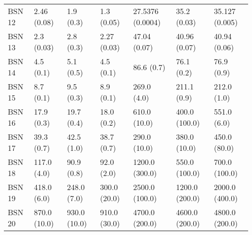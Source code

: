 \begin{tabular}{lllllll}
BSN 12 &       2.46 (0.08) &             1.9 (0.3) &         1.3 (0.05) &        27.5376 (0.0004) &                 35.2 (0.03) &           35.127 (0.005) \\
BSN 13 &        2.3 (0.03) &             2.8 (0.3) &        2.27 (0.03) &            47.04 (0.07) &                40.96 (0.07) &             40.94 (0.06) \\
BSN 14 &         4.5 (0.1) &             5.1 (0.5) &          4.5 (0.1) &              86.6 (0.7) &                  76.1 (0.2) &               76.9 (0.9) \\
BSN 15 &         8.7 (0.1) &             9.5 (0.3) &          8.9 (0.1) &             269.0 (4.0) &                 211.1 (0.9) &              212.0 (1.0) \\
BSN 16 &        17.9 (0.3) &            19.7 (0.4) &         18.0 (0.2) &            610.0 (10.0) &               400.0 (100.0) &              551.0 (6.0) \\
BSN 17 &        39.3 (0.7) &            42.5 (1.0) &         38.7 (0.7) &            290.0 (10.0) &                380.0 (10.0) &             450.0 (80.0) \\
BSN 18 &       117.0 (4.0) &            90.9 (0.8) &         92.0 (2.0) &          1200.0 (300.0) &               550.0 (100.0) &            700.0 (100.0) \\
BSN 19 &       418.0 (6.0) &           248.0 (7.0) &       300.0 (20.0) &          2500.0 (100.0) &              1200.0 (200.0) &           2000.0 (400.0) \\
BSN 20 &      870.0 (10.0) &          930.0 (10.0) &       910.0 (30.0) &          4700.0 (200.0) &              4600.0 (200.0) &           4800.0 (200.0) \\
\bottomrule
\end{tabular}

